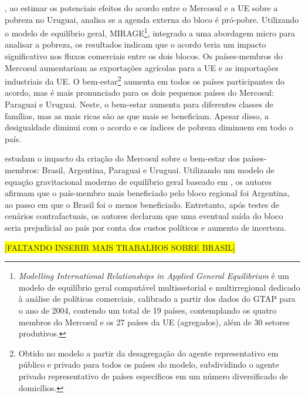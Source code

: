 \textcite{estrades12}, ao estimar os potenciais efeitos do acordo entre o Mercosul e a UE sobre a pobreza no Uruguai, analisa se a agenda externa do bloco é pró-pobre. Utilizando o modelo de equilíbrio geral, MIRAGE\footnote{\textit{Modelling International Relationships in Applied General Equilibrium} é um modelo de equilíbrio geral computável multissetorial e multirregional dedicado à análise de políticas comerciais, calibrado a partir dos dados do GTAP para o ano de 2004, contendo um total de 19 países, contemplando os quatro membros do Mercosul e os 27 países da UE (agregados), além de 30 setores produtivos.}, integrado a uma abordagem micro para analisar a pobreza, os resultados indicam que  o acordo teria um impacto significativo nos fluxos comerciais entre os dois blocos. Os países-membros do Mercosul aumentariam as exportações agrícolas para a UE e as importações industriais da UE. O bem-estar\footnote{Obtido no modelo a partir da desagregação do agente representativo em público e privado para todos os países do modelo, subdividindo o agente privado representativo de países específicos em um número diversificado de domicílios.} aumenta em todos os países participantes do acordo, mas é mais pronunciado para os dois pequenos países do Mercosul: Paraguai e Uruguai. Neste, o bem-estar aumenta para diferentes classes de famílias, mas as mais ricas são as que mais se beneficiam. Apesar disso, a desigualdade diminui com o acordo e os índices de pobreza diminuem em todo o país.

\textcite{campostimini22} estudam o impacto da criação do Mercosul sobre o bem-estar dos países-membros: Brasil, Argentina, Paraguai e Uruguai. Utilizando um modelo de equação gravitacional moderno de equilíbrio geral baseado em \textcite{arkolakis21}, os autores afirmam que o país-membro mais beneficiado pelo bloco regional foi Argentina, ao passo em que o Brasil foi o menos beneficiado. Entretanto, após testes de cenários contrafactuais, os autores declaram que uma eventual saída do bloco seria prejudicial ao país por conta dos custos políticos e aumento de incerteza.

\colorbox{yellow}{[FALTANDO INSERIR MAIS TRABALHOS SOBRE BRASIL]}


